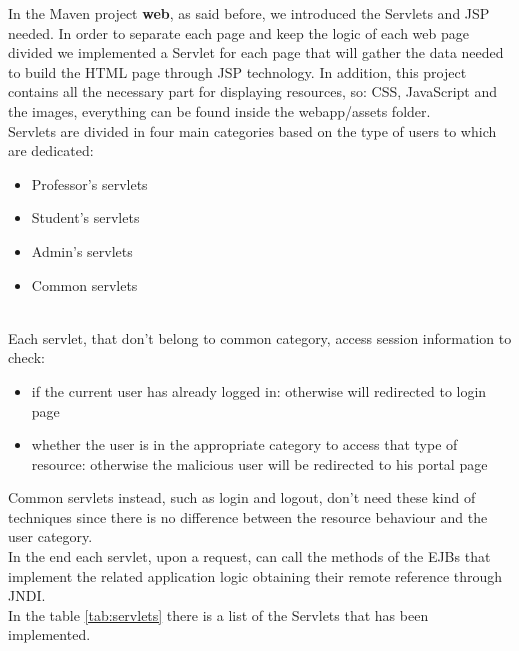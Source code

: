 In the Maven project \textbf{web}, as said before, we introduced the Servlets and JSP needed. In order to separate each page and keep the logic of each web page divided we implemented a Servlet for each page that will gather the data needed to build the HTML page through JSP technology. In addition, this project contains all the necessary part for displaying resources, so: CSS, JavaScript and the images, everything can be found inside the webapp/assets folder. \\
Servlets are divided in four main categories based on the type of users to which are dedicated:
\begin{itemize}
    \item Professor's servlets
    \item Student's servlets
    \item Admin's servlets
    \item Common servlets
\end{itemize}
\ \\
Each servlet, that don't belong to common category, access session information to check:
\begin{itemize}
    \item if the current user has already logged in: otherwise will redirected to login page
    \item whether the user is in the appropriate category to access that type of resource: otherwise the malicious user will be redirected to his portal page
\end{itemize}
Common servlets instead, such as login and logout, don't need these kind of techniques since there is no difference between the resource behaviour and the user category.
\ \\
In the end each servlet, upon a request, can call the methods of the EJBs that implement the related application logic obtaining their remote reference through JNDI.\\
In the table \ref{tab:servlets} there is a list of the Servlets that has been implemented.

